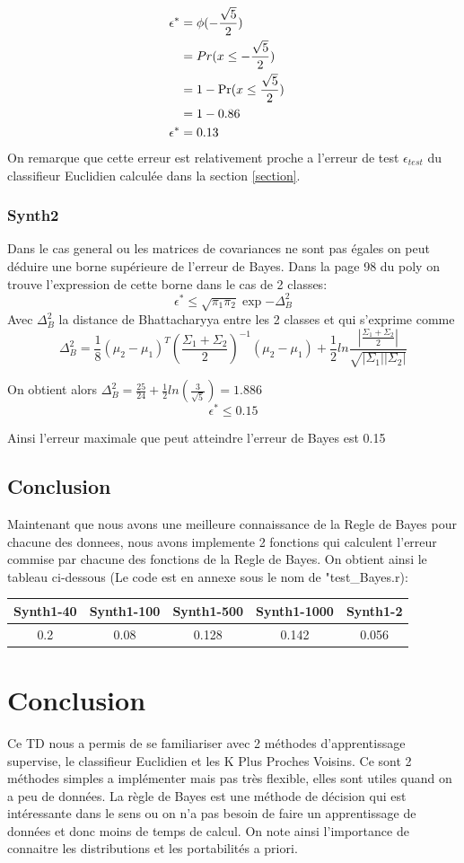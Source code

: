 \documentclass[10pt]{article}
\begin{document}
\begin{align}
 \epsilon^{*}  &=  \phi(-\frac{\sqrt{5}}{2}) \cr
& =  Pr(x \leq -\frac{\sqrt{5}}{2}) \cr
 &= 1 - \Pr(x \leq \frac{\sqrt{5}}{2})\cr
 & = 1 - 0.86\cr
 \epsilon^{*}  & = 0.13
\end{align}
On remarque  que cette erreur est relativement proche a l'erreur de test $\epsilon_{test}$ du classifieur Euclidien calculée dans la section \ref{section}. 



\subsubsection{Synth2}
Dans le cas general ou les matrices de covariances ne sont pas égales on peut déduire une borne supérieure de l'erreur de Bayes. Dans la page 98 du  poly on trouve l'expression de cette borne dans le  cas de 2 classes:
\[ \epsilon^{*} \leq \sqrt{\pi_{1}\pi_{2}}  \exp{-\Delta_{B}^{2}} \]
Avec $\Delta_{B}^{2}$ la distance de Bhattacharyya entre les 2 classes et qui s'exprime comme 
\[  \Delta_{B}^{2} = \frac{1}{8} (\mu_{2} - \mu_{1})^{T}  (\frac{\Sigma_{1} + \Sigma_{2}}{2})^{-1} (\mu_{2} - \mu_{1}) + 
\frac{1}{2} ln\frac{|\frac{\Sigma_{1}+\Sigma_{2}}{2}|}{\sqrt{|\Sigma_{1}| |\Sigma_{2}|}} \]

On obtient alors $\Delta_{B}^{2} = \frac{25}{24} +\frac{1}{2} ln(\frac{3}{\sqrt{5}} ) = 1.886$
\[  \epsilon^{*} \leq 0.15\]

Ainsi l'erreur maximale que peut atteindre l'erreur de Bayes est 0.15
\subsection{Conclusion}
Maintenant que nous avons une meilleure connaissance de la Regle de Bayes pour chacune des donnees, nous avons implemente 2 fonctions qui calculent l'erreur commise par chacune des fonctions de la Regle de Bayes. On obtient ainsi le tableau ci-dessous (Le code est en annexe sous le nom de "test\_Bayes.r):\\

\begin{tabular}{c | c| c| c|| c|}
	Synth1-40 & Synth1-100 & Synth1-500 & Synth1-1000 &  Synth1-2\\
	\hline
	0.2 & 0.08 & 0.128 & 	0.142 & 0.056
\end{tabular}

\section{Conclusion}
Ce TD nous a permis de se familiariser avec 2 méthodes d'apprentissage supervise, le classifieur Euclidien et les K Plus Proches Voisins.  Ce sont 2 méthodes simples a implémenter mais pas très flexible, elles sont utiles quand on a peu de données. La règle de Bayes est une méthode de décision qui est intéressante dans le sens ou on n'a pas besoin de faire un apprentissage de données et donc moins de temps de calcul. On note ainsi l'importance de connaitre les distributions et les portabilités a priori.
	
\end{document}
